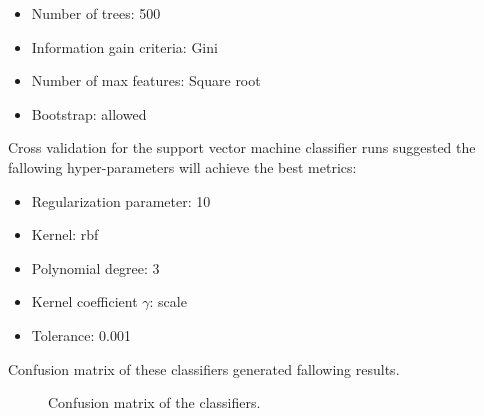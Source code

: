 \begin{itemize}
    \item Number of trees: 500
    \item Information gain criteria: Gini
    \item Number of max features: Square root
    \item Bootstrap: allowed
\end{itemize}

Cross validation for the support vector machine classifier runs suggested the fallowing hyper-parameters will achieve the best metrics:

\begin{itemize}
    \item Regularization parameter: 10
    \item Kernel: rbf
    \item Polynomial degree: 3
    \item Kernel coefficient $\gamma$: scale
    \item Tolerance: 0.001
\end{itemize}

Confusion matrix of these classifiers generated fallowing results.

\begin{figure}[H]%
    \centering
    \qquad
    \caption{Confusion matrix of the classifiers.}%
    \label{fig:cmatrix}%
\end{figure}

